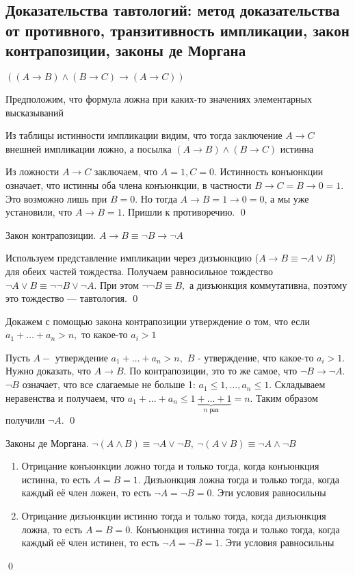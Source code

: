 \documentclass[a4paper]{article}
\begin{document}
\subsection{Доказательства тавтологий: метод доказательства от противного, транзитивность импликации, закон контрапозиции, законы де Моргана}
\theorem $((A\rightarrow B)\wedge(B\rightarrow C)\rightarrow(A\rightarrow C))$

\proof Предположим, что формула ложна при каких-то значениях элементарных высказываний

Из таблицы истинности импликации видим, что тогда заключение $A\rightarrow C$ внешней импликации ложно, а посылка $(A\rightarrow B)\wedge(B\rightarrow C)$ истинна

Из ложности $A\rightarrow C$ заключаем, что $A=1, C=0$. Истинность конъюнкции означает, что истинны оба члена конъюнкции, в частности $B\rightarrow C=B\rightarrow0=1$. Это возможно лишь при $B=0$. Но тогда $A\rightarrow B=1\rightarrow0=0$, а мы уже установили, что $A\rightarrow B=1$. Пришли к противоречию. \qed

\theorem Закон контрапозиции. $A\rightarrow B\equiv\neg B\rightarrow\neg A$

\proof Используем представление импликации через дизъюнкцию ($A\rightarrow B\equiv\neg A\vee B$) для обеих частей тождества. Получаем равносильное тождество $\neg A\vee B\equiv\neg\neg B\vee\neg A.$ При этом $\neg\neg B\equiv B,$ а дизъюнкция коммутативна, поэтому это тождество — тавтология. \qed

\ex Докажем с помощью закона контрапозиции утверждение о том, что если $a_1+\ldots+a_n>n,$ то какое-то $a_i>1$

Пусть $A-$ утверждение $a_1+\ldots+a_n>n,$ $B$ - утверждение, что какое-то $a_i>1$. Нужно доказать, что $A\rightarrow B$. По контрапозиции, это то же самое, что $\neg B\rightarrow\neg A$. $\neg B$ означает, что все слагаемые не больше 1: $a_1\leqslant1,\ldots,a_n\leqslant1.$ Складываем неравенства и получаем, что $a_1+\ldots+a_n\leqslant\underbrace{1+\ldots+1}_{n\text{ раз}}=n$. Таким образом получили $\neg A$. \qed

\theorem Законы де Моргана. $\neg(A\wedge B)\equiv\neg A\vee\neg B,\ \neg(A\vee B)\equiv\neg A\wedge\neg B$

\proof
\begin{enumerate}
    \item Отрицание конъюнкции ложно тогда и только тогда, когда конъюнкция истинна, то есть $A = B = 1$. Дизъюнкция ложна тогда и только тогда, когда каждый её член ложен, то есть $\neg A=\neg B=0$. Эти условия равносильны
    \item Отрицание дизъюнкции истинно тогда и только тогда, когда дизъюнкция ложна, то есть $A = B = 0$. Конъюнкция истинна тогда и только тогда, когда каждый её член истинен, то есть $\neg A=\neg B=1$. Эти условия равносильны
\end{enumerate}\qed 
\end{document}
